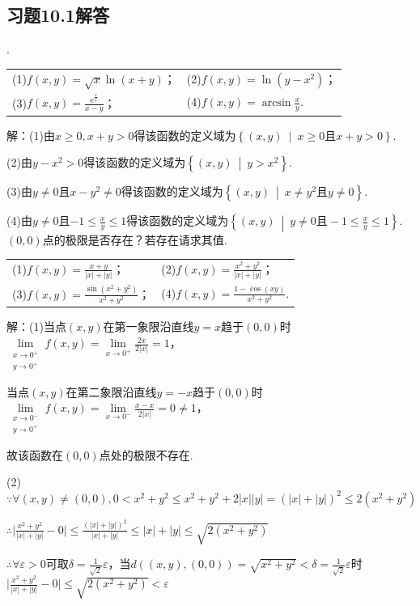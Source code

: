 \documentclass[12pt,UTF8]{ctexart}
\newcommand\Set[2]{\left\{#1\ \middle\vert\ #2 \right\}}
\begin{document}
\subsection{习题10.1解答}
\begin{enumerate}
.

\begin{tabular}{ll}
(1)$f(x,y)=\sqrt x\ln(x+y)$；&(2)$f(x,y)=\ln(y-x^2)$；\\
(3)$f(x,y)=\frac{\mathrm e^{\frac xy}}{x-y}$；&(4)$f(x,y)=\arcsin\frac xy$.
\end{tabular}

解：(1)由$x\geq0,x+y>0$得该函数的定义域为$\Set{(x,y)}{x\geq0\text{且}x+y>0}$.

(2)由$y-x^2>0$得该函数的定义域为$\Set{(x,y)}{y>x^2}$.

(3)由$y\neq0$且$x-y^2\neq0$得该函数的定义域为$\Set{(x,y)}{x\neq y^2\text{且}y\neq0}$.

(4)由$y\neq0$且$-1\leq\frac xy\leq1$得该函数的定义域为$\Set{(x,y)}{y\neq0\text{且}-1\leq\frac xy\leq1}$.
$(0,0)$点的极限是否存在？若存在请求其值.

\begin{tabular}{ll}
(1)$f(x,y)=\frac{x+y}{|x|+|y|}$；&(2)$f(x,y)=\frac{x^2+y^2}{|x|+|y|}$；\\
(3)$f(x,y)=\frac{\sin(x^2+y^2)}{x^2+y^2}$；&(4)$f(x,y)=\frac{1-\cos(xy)}{x^2+y^2}$.
\end{tabular}

解：(1)当点$(x,y)$在第一象限沿直线$y=x$趋于$(0,0)$时$\lim\limits_{\substack{x\rightarrow0^+\\ y\rightarrow0^+}}f(x,y)=\lim\limits_{x\rightarrow0^+}\frac{2x}{2|x|}=1$，

当点$(x,y)$在第二象限沿直线$y=-x$趋于$(0,0)$时$\lim\limits_{\substack{x\rightarrow0^-\\ y\rightarrow0^+}}f(x,y)=\lim\limits_{x\rightarrow0^-}\frac{x-x}{2|x|}=0\neq1$，

故该函数在$(0,0)$点处的极限不存在.

(2)$\because\forall(x,y)\neq(0,0),0<x^2+y^2\leq x^2+y^2+2|x||y|=(|x|+|y|)^2\leq2(x^2+y^2)$

$\therefore\Big|\frac{x^2+y^2}{|x|+|y|}-0\Big|\leq\frac{(|x|+|y|)^2}{|x|+|y|}\leq|x|+|y|\leq\sqrt{2(x^2+y^2)}$

$\therefore\forall\varepsilon>0$可取$\delta=\frac1{\sqrt2}\varepsilon$，当$d((x,y),(0,0))=\sqrt{x^2+y^2}<\delta=\frac1{\sqrt2}\varepsilon$时\\
$\Big|\frac{x^2+y^2}{|x|+|y|}-0\Big|\leq\sqrt{2(x^2+y^2)}<\varepsilon$


\end{enumerate}
\end{document}
